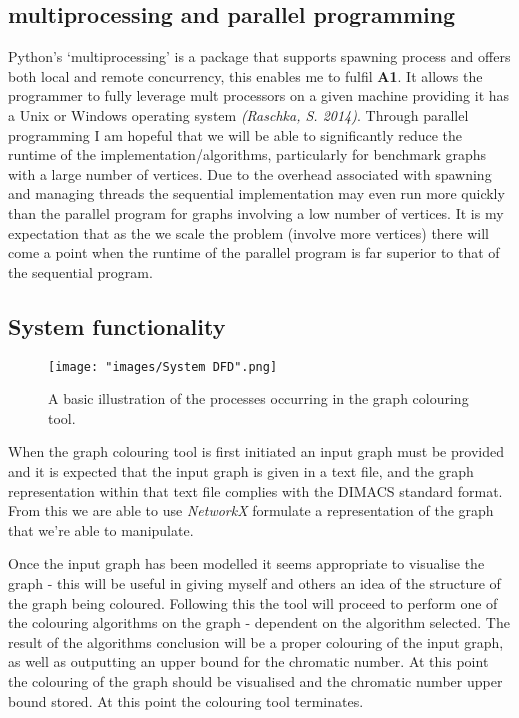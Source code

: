 \documentclass[12pt,a4paper]{article}
\begin{document}
\subsection*{multiprocessing and parallel programming}
\noindent
Python's `multiprocessing' is a package that supports spawning process and offers both local and remote concurrency, this enables me to fulfil \textbf{A1}. It allows the programmer to fully leverage mult processors on a given machine providing it has a Unix or Windows operating system \textit{(Raschka, S. 2014)}. Through parallel programming I am hopeful that we will be able to significantly reduce the runtime of the implementation/algorithms, particularly for benchmark graphs with a large number of vertices. Due to the overhead associated with spawning and managing threads the sequential implementation may even run more quickly than the parallel program for graphs involving a low number of vertices. It is my expectation that as the we scale the problem (involve more vertices) there will come a point when the runtime of the parallel program is far superior to that of the sequential program.
\subsection*{System functionality}
\noindent
\begin{wrapfigure}{h}{0.565\textwidth}
\texttt{[image: "images/System DFD".png]}
\caption{A basic illustration of the processes occurring in the graph colouring tool.}
\label{fig:hyb}
\end{wrapfigure}
When the graph colouring tool is first initiated an input graph must be provided and it is expected that the input graph is given in a text file, and the graph representation within that text file complies with the DIMACS standard format. From this we are able to use  \textit{NetworkX} formulate a representation of the graph that we're able to manipulate.
\par Once the input graph has been modelled it seems appropriate to visualise the graph - this will be useful in giving myself and others an idea of the structure of the graph being coloured. Following this the tool will proceed to perform one of the colouring algorithms on the graph - dependent on the algorithm selected. The result of the algorithms conclusion will be a proper colouring of the input graph, as well as outputting an upper bound for the chromatic number. At this point the colouring of the graph should be visualised and the chromatic number upper bound stored. At this point the colouring tool terminates.
\end{document}
